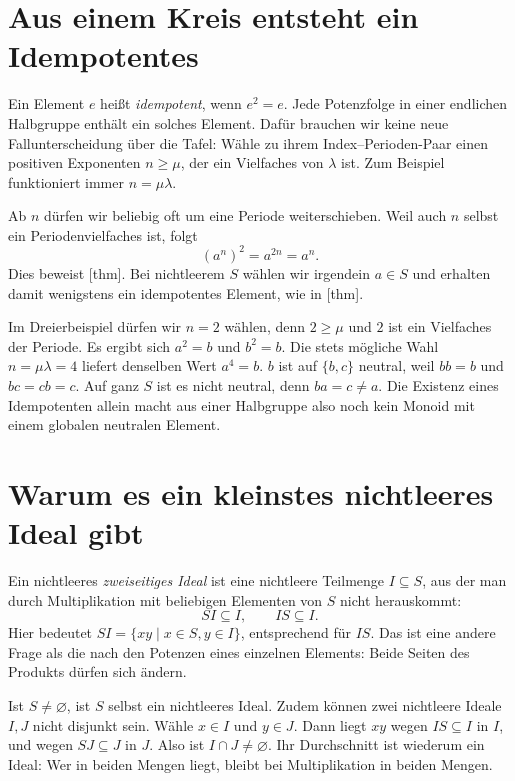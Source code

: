 \section*{Aus einem Kreis entsteht ein Idempotentes}

Ein Element \(e\) heißt \emph{idempotent}, wenn \(e^2=e\).
Jede Potenzfolge in einer endlichen Halbgruppe enthält ein solches
Element. Dafür brauchen wir keine neue Fallunterscheidung über die
Tafel: Wähle zu ihrem Index--Perioden-Paar einen positiven Exponenten
\(n\geq\mu\), der ein Vielfaches von \(\lambda\) ist. Zum Beispiel
funktioniert immer \(n=\mu\lambda\).

Ab \(n\) dürfen wir beliebig oft um eine Periode weiterschieben.
Weil auch \(n\) selbst ein Periodenvielfaches ist, folgt
\[
  (a^n)^2=a^{2n}=a^n.
\]
Dies beweist [thm].
Bei nichtleerem \(S\) wählen wir irgendein \(a\in S\) und erhalten
damit wenigstens ein idempotentes Element, wie in
[thm].

Im Dreierbeispiel dürfen wir \(n=2\) wählen, denn \(2\geq\mu\)
und \(2\) ist ein Vielfaches der Periode. Es ergibt sich
\(a^2=b\) und \(b^2=b\). Die stets mögliche Wahl
\(n=\mu\lambda=4\) liefert denselben Wert \(a^4=b\).
\(b\) ist auf \(\{b,c\}\) neutral, weil \(bb=b\) und \(bc=cb=c\).
Auf ganz \(S\) ist es nicht neutral, denn \(ba=c\ne a\).
Die Existenz eines Idempotenten allein macht aus einer Halbgruppe
also noch kein Monoid mit einem globalen neutralen Element.

\section*{Warum es ein kleinstes nichtleeres Ideal gibt}
\hypertarget{finite-semigroups.reading.ideals}{}

Ein nichtleeres \emph{zweiseitiges Ideal} ist eine nichtleere Teilmenge
\(I\subseteq S\), aus der man durch Multiplikation mit beliebigen
Elementen von \(S\) nicht herauskommt:
\[
  SI\subseteq I,\qquad IS\subseteq I.
\]
Hier bedeutet \(SI=\{xy\mid x\in S,y\in I\}\), entsprechend für
\(IS\). Das ist eine andere Frage als die nach den Potenzen eines
einzelnen Elements: Beide Seiten des Produkts dürfen sich ändern.

Ist \(S\ne\varnothing\), ist \(S\) selbst ein nichtleeres Ideal.
Zudem können zwei nichtleere Ideale \(I,J\) nicht disjunkt sein.
Wähle \(x\in I\) und \(y\in J\). Dann liegt \(xy\) wegen
\(IS\subseteq I\) in \(I\), und wegen \(SJ\subseteq J\) in \(J\).
Also ist \(I\cap J\ne\varnothing\). Ihr Durchschnitt ist wiederum
ein Ideal: Wer in beiden Mengen liegt, bleibt bei Multiplikation
in beiden Mengen.

